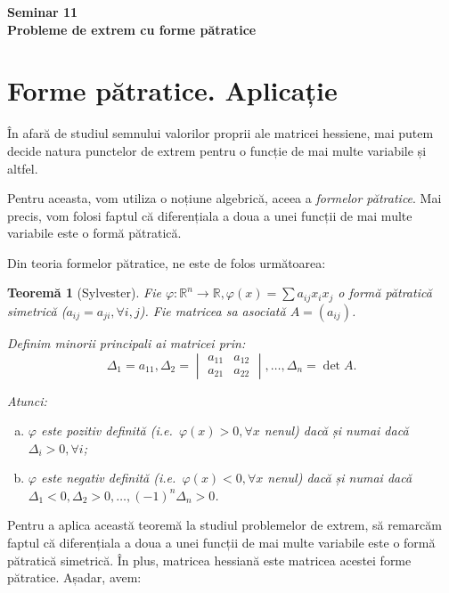 \documentclass[11pt,a4paper]{article}
\newcommand\RR{\mathbb{R}}
\theoremstyle{dotless}
\newtheorem{theorem}{Teorem\u{a}}[section]
\theoremstyle{dotlessdr}
\begin{document}
\begin{center}
  {\large\textbf{Seminar 11 \\
    Probleme de extrem cu forme pătratice}}
\end{center}

\vspace{1cm}


\section{Forme pătratice. Aplicație}
\label{sec:f-patr}

În afară de studiul semnului valorilor proprii ale matricei hessiene, mai putem
decide natura punctelor de extrem pentru o funcție de mai multe variabile și
altfel.

Pentru aceasta, vom utiliza o noțiune algebrică, aceea a \emph{formelor pătratice}.
Mai precis, vom folosi faptul că diferențiala a doua a unei funcții de mai multe
variabile este o formă pătratică.

Din teoria formelor pătratice, ne este de folos următoarea:

\begin{theorem}[Sylvester]\label{thm:sylv-f-patr}
  Fie $\varphi : \RR^n \to \RR, \varphi(x) = \sum a_{ij} x_i x_j$ o formă pătratică
  simetrică ($a_{ij} = a_{ji}, \forall i, j$). Fie matricea sa asociată $A = (a_{ij})$.

  Definim \emph{minorii principali ai matricei} prin:
  \[
    \Delta_1 = a_{11}, %
    \Delta_2 = \begin{vmatrix}
      a_{11} & a_{12} \\
      a_{21} & a_{22}
    \end{vmatrix}, %
    \dots, %
    \Delta_n = \det A.
  \]

  Atunci:
  \begin{enumerate}[(a)]
  \item $\varphi$ este \emph{pozitiv definită} (i.e.\ $\varphi(x) > 0, \forall x$ nenul)
    dacă și numai dacă $\Delta_i > 0, \forall i$;
  \item $\varphi$ este \emph{negativ definită} (i.e.\ $\varphi(x) < 0, \forall x$ nenul)
    dacă și numai dacă $\Delta_1 < 0, \Delta_2 > 0, \dots, (-1)^n \Delta_n > 0$.
  \end{enumerate}
\end{theorem}

Pentru a aplica această teoremă la studiul problemelor de extrem, să remarcăm faptul
că diferențiala a doua a unei funcții de mai multe variabile este o formă pătratică
simetrică. În plus, matricea hessiană este matricea acestei forme pătratice.
Așadar, avem:
\end{document}

